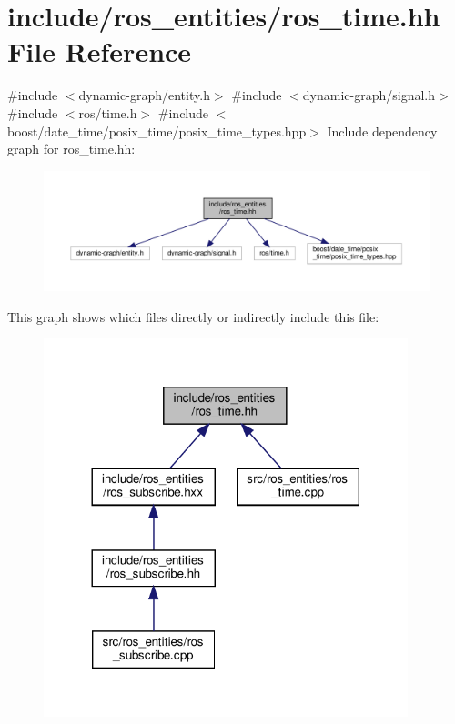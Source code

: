 \hypertarget{ros__time_8hh}{}\section{include/ros\+\_\+entities/ros\+\_\+time.hh File Reference}
\label{ros__time_8hh}
{\ttfamily \#include $<$dynamic-\/graph/entity.\+h$>$}\newline
{\ttfamily \#include $<$dynamic-\/graph/signal.\+h$>$}\newline
{\ttfamily \#include $<$ros/time.\+h$>$}\newline
{\ttfamily \#include $<$boost/date\+\_\+time/posix\+\_\+time/posix\+\_\+time\+\_\+types.\+hpp$>$}\newline
Include dependency graph for ros\+\_\+time.\+hh\+:
\nopagebreak
\begin{figure}[H]
\begin{center}
\leavevmode
\includegraphics[width=350pt]{ros__time_8hh__incl}
\end{center}
\end{figure}
This graph shows which files directly or indirectly include this file\+:
\nopagebreak
\begin{figure}[H]
\begin{center}
\leavevmode
\includegraphics[width=300pt]{ros__time_8hh__dep__incl}
\end{center}
\end{figure}
